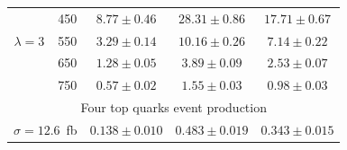 \begin{table}[p]
\begin{center}
\begin{tabular}{c|c|c|c|c}
      \hline
      & 450 & $8.77 \pm 0.46$ & $28.31 \pm 0.86$ & $17.71 \pm 0.67$ \\
      $\lambda=3$ & 550 & $3.29 \pm 0.14$ & $10.16  \pm 0.26$ & $7.14  \pm 0.22$ \\
      & 650 & $1.28 \pm 0.05$ & $3.89  \pm 0.09$ & $2.53  \pm 0.07$ \\
      & 750 & $0.57 \pm 0.02$ & $1.55  \pm 0.03$ & $0.98  \pm 0.03$ \\
      \hline
      \multicolumn{5}{c}{Four top quarks event production} \\
      \hline
      \multicolumn{2}{c|}{$\sigma=12.6$~fb} & $0.138 \pm 0.010$ & $0.483\pm 0.019$& $0.343\pm 0.015$\\
      \hline
    \end{tabular}
  \end{center}
\end{table}



